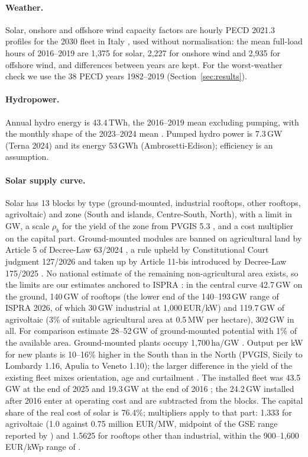 \paragraph{Weather.} Solar, onshore and offshore wind capacity factors are hourly PECD 2021.3 profiles for the 2030 fleet in Italy \citep{PECD2021}, used without normalisation: the mean full-load hours of 2016--2019 are 1{,}375 for solar, 2{,}227 for onshore wind and 2{,}935 for offshore wind, and differences between years are kept. For the worst-weather check we use the 38 PECD years 1982--2019 (Section~\ref{sec:results}).

\paragraph{Hydropower.} Annual hydro energy is 43.4\,TWh, the 2016--2019 mean excluding pumping, with the monthly shape of the 2023--2024 mean \citep{Terna2025m}. Pumped hydro power is 7.3\,GW (Terna 2024) and its energy 53\,GWh (Ambrosetti-Edison); efficiency is an assumption.

\paragraph{Solar supply curve.} Solar has 13 blocks by type (ground-mounted, industrial rooftops, other rooftops, agrivoltaic) and zone (South and islands, Centre-South, North), with a limit in GW, a scale $\rho_b$ for the yield of the zone from PVGIS 5.3 \citep{PVGIS}, and a cost multiplier on the capital part. Ground-mounted modules are banned on agricultural land by Article 5 of Decree-Law 63/2024 \citep{DL63}, a rule upheld by Constitutional Court judgment 127/2026 and taken up by Article 11-bis introduced by Decree-Law 175/2025 \citep{Consulta127}. No national estimate of the remaining non-agricultural area exists, so the limits are our estimates anchored to ISPRA \citep{ISPRA2026}: in the central curve 42.7\,GW on the ground, 140\,GW of rooftops (the lower end of the 140--193\,GW range of ISPRA 2026, of which 30\,GW industrial at 1{,}000\,EUR/kW) and 119.7\,GW of agrivoltaic (3\% of suitable agricultural area at 0.5\,MW per hectare), 302\,GW in all. For comparison \citet{Ranjgar2025} estimate 28--52\,GW of ground-mounted potential with 1\% of the available area. Ground-mounted plants occupy 1{,}700\,ha/GW \citep{ISPRA2026}. Output per kW for new plants is 10--16\% higher in the South than in the North (PVGIS, Sicily to Lombardy 1.16, Apulia to Veneto 1.10); the larger difference in the yield of the existing fleet mixes orientation, age and curtailment \citep{GSE2025}. The installed fleet was 43.5\,GW at the end of 2025 and 19.3\,GW at the end of 2016 \citep{ItaliaSolareQ4}; the 24.2\,GW installed after 2016 enter at operating cost and are subtracted from the blocks. The capital share of the real cost of solar is 76.4\%; multipliers apply to that part: 1.333 for agrivoltaic (1.0 against 0.75 million EUR/MW, midpoint of the GSE range reported by \citet{QualEnergiaAgri}) and 1.5625 for rooftops other than industrial, within the 900--1{,}600\,EUR/kWp range of \citet{FraunhoferEN2024}.

